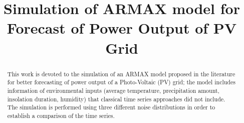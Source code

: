 \documentclass[conference]{IEEEtran}
\begin{document}
\title{Simulation of ARMAX model for Forecast of Power Output of PV Grid\\}

\author{
\and
{}
}

\maketitle

\begin{abstract}
This work is devoted to the simulation of an ARMAX model proposed in the literature for better forecasting of power output of a Photo-Voltaic (PV) grid; the model includes information of environmental inputs (average temperature, precipitation amount, insolation duration, humidity) that classical time series approaches did not include. The simulation is performed using three different noise distributions in order to establish a comparison of the time series.
\end{abstract}

\begin{IEEEkeywords}

\end{IEEEkeywords}







\nocite{*}


\end{document}

